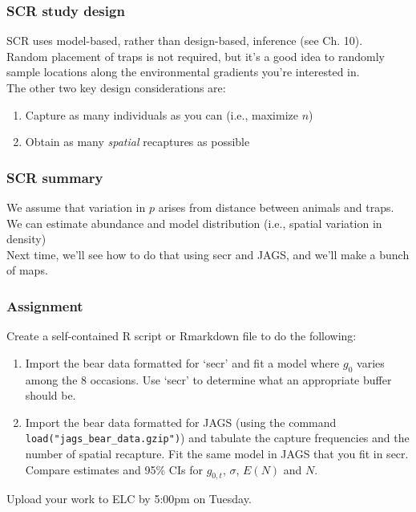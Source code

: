 \documentclass[color=usenames,dvipsnames]{beamer}\usepackage[]{graphicx}\usepackage[]{xcolor}
\newcommand{\inr}[1]{\colorbox{inlinecolor}{\texttt{#1}}}
\begin{document}
\begin{frame}
  \frametitle{SCR study design}
  SCR uses model-based, rather than design-based,
  inference (see Ch. 10). \\ 
  \pause
  \vfill
  Random placement of traps is not required, but it's a good idea to
  randomly sample locations along the environmental gradients you're
  interested in. \\
  \pause \vfill
  The other two key design considerations are:
  \begin{enumerate}
    \item<3-> Capture as many individuals as you can (i.e., maximize $n$)
    \item<4-> Obtain as many {\it spatial} recaptures as possible
  \end{enumerate}
  \vfill
\end{frame}



\begin{frame}
  \frametitle{SCR summary}
  We assume that variation in $p$ arises from distance between animals
  and traps. \\
  \pause \vfill
  We can estimate abundance and model distribution (i.e., spatial
  variation in density) \\
  \pause \vfill
  Next time, we'll see how to do that using secr and JAGS, and we'll
  make a bunch of maps. \\
\end{frame}








\begin{frame}[fragile]
  \frametitle{Assignment}
  Create a self-contained R script or Rmarkdown file to do the
  following: 
  \vfill
  \begin{enumerate}
    \item Import the bear data formatted for `secr' and fit a model
      where $g_0$ varies among the 8 occasions. Use `secr' to
      determine what an appropriate buffer should be.
    \item Import the bear data formatted for JAGS (using the command
      \inr{load("jags\_bear\_data.gzip")}) and tabulate the 
      capture frequencies and the number of spatial recapture. Fit the
      same model in JAGS that you fit in secr. Compare estimates and 95\% CIs
      for $g_{0,t}$, $\sigma$, $E(N)$ and $N$.  
  \end{enumerate}
  \vfill
  Upload your work to ELC by 5:00pm on Tuesday. 
\end{frame}
\end{document}
